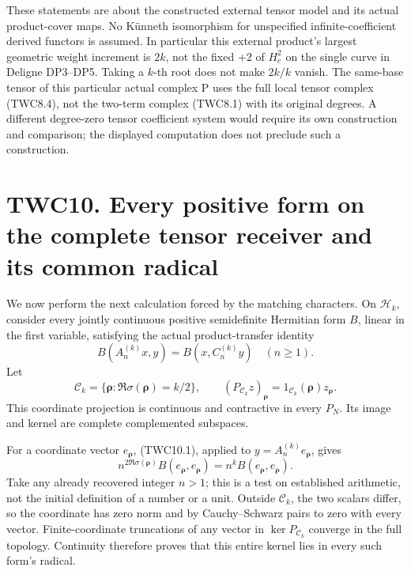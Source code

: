 These statements are about the constructed external tensor model and its
actual product-cover maps. No Künneth isomorphism for unspecified
infinite-coefficient derived functors is assumed. In particular this
external product's largest geometric weight increment is \(2k\), not the
fixed \(+2\) of \(H_c^2\) on the single curve in Deligne DP3--DP5.
Taking a \(k\)-th root does not make \(2k/k\) vanish. The same-base
tensor of this particular actual complex P uses the full local tensor
complex (TWC8.4), not the two-term complex (TWC8.1) with its original
degrees. A different degree-zero tensor coefficient system would require
its own construction and comparison; the displayed computation does not
preclude such a construction.

\section{TWC10. Every positive form on the complete tensor receiver and
its common
radical}\label{twc10.-every-positive-form-on-the-complete-tensor-receiver-and-its-common-radical}

We now perform the next calculation forced by the matching characters.
On \(\mathscr H_k\), consider every jointly continuous positive
semidefinite Hermitian form \(B\), linear in the first variable,
satisfying the actual product-transfer identity \[
B(A_n^{(k)}x,y)=B(x,C_n^{(k)}y)\quad(n\ge1).
\tag{TWC10.1}
\] Let \[
\mathscr C_k=\{\boldsymbol\rho:\Re\sigma(\boldsymbol\rho)=k/2\},
\qquad (P_{\mathscr C_k}z)_{\boldsymbol\rho}=1_{\mathscr C_k}(\boldsymbol\rho)z_{\boldsymbol\rho}.
\tag{TWC10.2}
\] This coordinate projection is continuous and contractive in every
\(P_N\). Its image and kernel are complete complemented subspaces.

For a coordinate vector \(e_{\boldsymbol\rho}\), (TWC10.1), applied to
\(y=A_n^{(k)}e_{\boldsymbol\rho}\), gives \[
n^{2\Re\sigma(\boldsymbol\rho)}B(e_{\boldsymbol\rho},e_{\boldsymbol\rho})
=n^kB(e_{\boldsymbol\rho},e_{\boldsymbol\rho}).
\tag{TWC10.3}
\] Take any already recovered integer \(n>1\); this is a test on
established arithmetic, not the initial definition of a number or a
unit. Outside \(\mathscr C_k\), the two scalars differ, so the
coordinate has zero norm and by Cauchy--Schwarz pairs to zero with every
vector. Finite-coordinate truncations of any vector in
\(\ker P_{\mathscr C_k}\) converge in the full topology. Continuity
therefore proves that this entire kernel lies in every such form's
radical.

